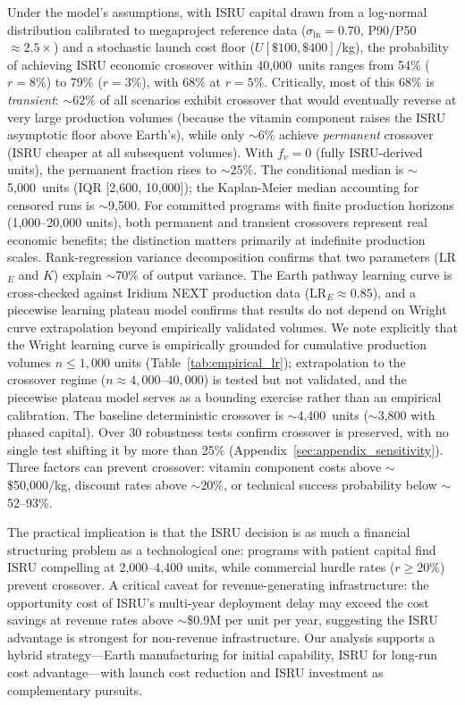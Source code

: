 \documentclass[preprint,12pt]{elsarticle}
\begin{document}
Under the model's assumptions, with ISRU capital drawn from a log-normal distribution calibrated to megaproject reference data \cite{flyvbjerg2014} ($\sigma_{\ln} = 0.70$, P90/P50 $\approx 2.5\times$) and a stochastic launch cost floor ($U[\$100, \$400]$/kg), the probability of achieving ISRU economic crossover within 40{,}000~units ranges from 54\% ($r = 8\%$) to 79\% ($r = 3\%$), with 68\% at $r = 5\%$. Critically, most of this 68\% is \emph{transient}: ${\sim}62\%$ of all scenarios exhibit crossover that would eventually reverse at very large production volumes (because the vitamin component raises the ISRU asymptotic floor above Earth's), while only ${\sim}6\%$ achieve \emph{permanent} crossover (ISRU cheaper at all subsequent volumes). With $f_v = 0$ (fully ISRU-derived units), the permanent fraction rises to ${\sim}25\%$. The conditional median is $\sim$5{,}000~units (IQR [2{,}600, 10{,}000]); the Kaplan-Meier median accounting for censored runs is $\sim$9{,}500. For committed programs with finite production horizons (1{,}000--20{,}000 units), both permanent and transient crossovers represent real economic benefits; the distinction matters primarily at indefinite production scales. Rank-regression variance decomposition confirms that two parameters (LR$_E$ and $K$) explain $\sim$70\% of output variance. The Earth pathway learning curve is cross-checked against Iridium NEXT production data ($\mathrm{LR}_E \approx 0.85$), and a piecewise learning plateau model confirms that results do not depend on Wright curve extrapolation beyond empirically validated volumes. We note explicitly that the Wright learning curve is empirically grounded for cumulative production volumes $n \leq 1{,}000$ units (Table~\ref{tab:empirical_lr}); extrapolation to the crossover regime ($n \approx 4{,}000$--$40{,}000$) is tested but not validated, and the piecewise plateau model serves as a bounding exercise rather than an empirical calibration. The baseline deterministic crossover is $\sim$4{,}400~units ($\sim$3{,}800 with phased capital). Over 30 robustness tests confirm crossover is preserved, with no single test shifting it by more than 25\% (Appendix~\ref{sec:appendix_sensitivity}). Three factors can prevent crossover: vitamin component costs above $\sim$\$50{,}000/kg, discount rates above $\sim$20\%, or technical success probability below $\sim$52--93\%.

The practical implication is that the ISRU decision is as much a financial structuring problem as a technological one: programs with patient capital find ISRU compelling at 2{,}000--4{,}400 units, while commercial hurdle rates ($r \geq 20\%$) prevent crossover. A critical caveat for revenue-generating infrastructure: the opportunity cost of ISRU's multi-year deployment delay may exceed the cost savings at revenue rates above $\sim$\$0.9M per unit per year, suggesting the ISRU advantage is strongest for non-revenue infrastructure. Our analysis supports a hybrid strategy---Earth manufacturing for initial capability, ISRU for long-run cost advantage---with launch cost reduction and ISRU investment as complementary pursuits.
\end{document}
